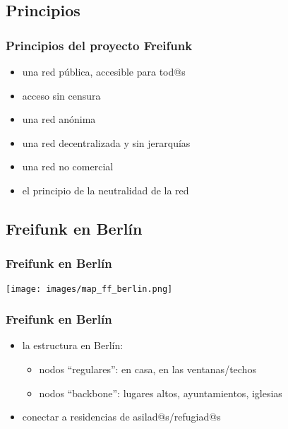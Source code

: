 \documentclass[12pt, xcolor=table]{beamer}
\begin{document}
\subsection{Principios}
\begin{frame}
  \frametitle{Principios del proyecto Freifunk}
  \begin{itemize}
    \item una red pública, accesible para tod@s
    \item acceso sin censura
    \item una red anónima
    \item una red decentralizada y sin jerarquías
    \item una red no comercial
    \item el principio de la neutralidad de la red
  \end{itemize}
\end{frame}

\begin{comment}
\begin{frame}
  \frametitle{Un ejemplo: el proyecto Freifunk}
  \begin{itemize}
    \item comunidades locales por toda Alemania
    \item la estructura en Berlín: backbones, etc
    \item principios de la comunidad Freifunk?
    \item conectar a residencias de asilad@s/refugiad@s
    \item el principio de la neutralidad de la red
    \item add logo
  \end{itemize}
\end{frame}
\end{comment}

\subsection{Freifunk en Berlín}
\begin{frame}
  \frametitle{Freifunk en Berlín}
    \vspace{180pt}
    \texttt{[image: images/map\_ff\_berlin.png]}
\end{frame}

\begin{frame}
  \frametitle{Freifunk en Berlín}
  \begin{itemize}
    \item la estructura en Berlín:
      \begin{itemize}
        \item nodos ``regulares'': en casa, en las ventanas/techos
        \item nodos ``backbone'': lugares altos, ayuntamientos, iglesias
      \end{itemize}
    \item conectar a residencias de asilad@s/refugiad@s
  \end{itemize}
\end{frame}
\end{document}

